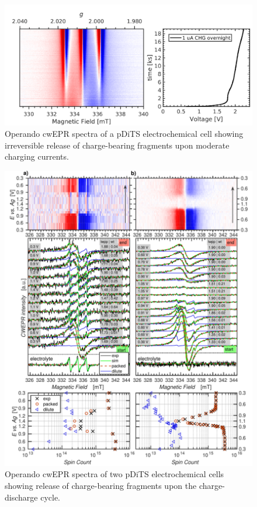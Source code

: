 \begin{figure}[!h]
\center
	\includegraphics[width=1\textwidth]{./operando_epr/figures/degradation/pDiTS_slow_charge_MS5000_forslides.png}
	\caption{Operando cwEPR spectra of a pDiTS electrochemical cell showing irreversible release of charge-bearing fragments upon moderate charging currents.}
	\label{fig:operando_degradation_3_lines_release}
\end{figure}


\begin{figure}[!h]
\center
	\includegraphics[width=1\textwidth]{./operando_epr/figures/degradation/operando_degradation_dits.pdf}
	\caption{Operando cwEPR spectra of two pDiTS electrochemical cells showing release of charge-bearing fragments upon the charge-discharge cycle.}
	\label{fig:operando_degradation}
\end{figure}

